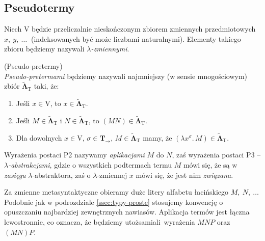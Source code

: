 \subsection{Pseudotermy}
  Niech \(\mathrm{V}\) będzie przeliczalnie nieskończonym zbiorem zmiennych przedmiotowych \(x,\ y,\ \dots\ \) (indeksowanych być może liczbami naturalnymi). Elementy takiego zbioru będziemy nazywali \emph{\(\lambda\)-zmiennymi}.
\begin{definicja}(Pseudo-pretermy)\\
  \emph{Pseudo-pretermami} będziemy nazywali najmniejszy (w sensie mnogościowym) zbiór \(\mathbf{\tilde\Lambda}_{\mathrm{T}}\) taki, że:

\begin{enumerate}[label=P\arabic*.]
  \item Jeśli \(x\in \mathrm{V}\), to \(x\in{\mathbf{\tilde\Lambda}}_{\mathrm{T}}\).
  \item Jeśli \(M\in\mathbf{\tilde{\Lambda}}_{\mathrm{T}}\) i \(N\in\mathbf{\tilde{\Lambda}}_{\mathrm{T}}\), to \((MN)\in\mathbf{\tilde{\Lambda}}_{\mathrm{T}}\).
  \item Dla dowolnych \(x\in \mathrm{V}\), \(\sigma\in\mathbf{T}_\to\), \(M\in\mathbf{\tilde{\Lambda}}_{\mathrm{T}}\) mamy, że \((\lambda x^{\sigma}.\,M)\in \mathbf{\tilde{\Lambda}}_{\mathrm{T}}\).
  \end{enumerate}
\end{definicja}
  Wyrażenia postaci P2 nazywamy \emph{aplikacjami} \(M\) do \(N\), zaś wyrażenia postaci P3 -- \emph{\(\lambda\)-abstrakcjami}, gdzie o wszystkich podtermach termu \(M\) mówi się, że są w \emph{zasięgu} \(\lambda\)-abstraktora, zaś o \(\lambda\)-zmiennej \(x\) mówi się, że jest nim \emph{związana}.

  Za zmienne metasyntaktyczne obieramy duże litery alfabetu łacińskiego \(M,\ N,\ \dots\ \) Podobnie jak w podrozdziale \ref{ssec:typy-proste} stosujemy konwencję o opuszczaniu najbardziej zewnętrznych nawiasów. Aplikacja termów jest łączna lewostronnie, co oznacza, że będziemy utożsamiali wyrażenia \(MNP\) oraz \((MN)P\).

